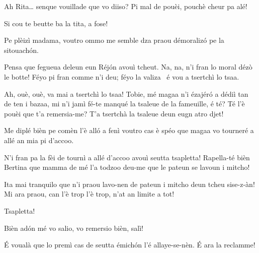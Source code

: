 \begin{drama}
\Tobiespeaks Ah Rita\ldots {} senque vouillade que vo diiso? Pi mal de pouèi, pouchè cheur pa alé!

\Bertinaspeaks Si cou te beutte ba la tita, a fose!

\Ritaspeaks Pe plèizì madama, voutro ommo me semble dza praou démoralizó pe la sitouachón.

\Tobiespeaks Pensa que fegueua deleun eun Réjón avouì tcheut. Na, na, n’i fran lo moral dézò le botte! Féyo pi fran comme n’i deu; féyo la valiza \valigia\ é vou a tsertchì lo tsaa.

\Bertinaspeaks Ah, ouè, ouè, va mai a tsertchì lo tsaa! Tobie, mé magaa n’i ézajéró a dédiì tan de ten i bazaa, mi n’i jamì fé-te manqué la tsaleue de la fameuille, é té? Té l’è pouèi que t’a remersia-me? T’a tsertchà la tsaleue deun eugn atro djet!

\Ritaspeaks Me diplé bièn pe comèn l’è alló a fenì voutro cas è spéo que magaa vo tourneré a allé an mia pi d’accoo.

\Tobiespeaks N’i fran pa la fèi de tournì a allé d’accoo avouì seutta tsapletta! Rapella-té bièn Bertina que mamma de mé l’a todzoo deu-me que le pateun se lavoun i mitcho!

\Bertinaspeaks Ita mai tranquilo que n’i praou lavo-nen de pateun i mi\-tcho deun tcheu sise-z-àn! Mi ara praou, can l’è trop l’è trop, n'at an limite a tot!

\Tobiespeaks Tsapletta!

\Ritaspeaks Bièn ad\'on mé vo salio, vo remersio bièn, salì!


\Ritaspeaks É voualà que lo premì cas de seutta émichón l'é allaye-se-nèn. \'E ara la reclamme!




\end{drama}
